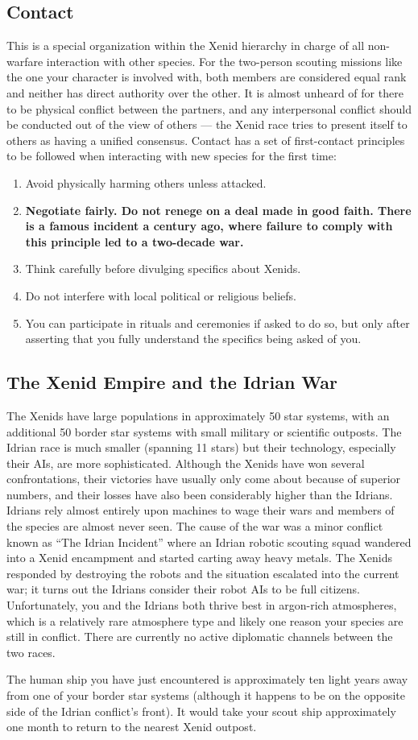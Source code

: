 \documentclass[blue]{guildcamp1}
\begin{document}
\subsection*{Contact}

This is a special organization within the Xenid hierarchy in charge of all non-warfare interaction with other species. For the two-person scouting missions like the one your character is involved with, both members are considered equal rank and neither has direct authority over the other. It is almost unheard of for there to be physical conflict between the partners, and any interpersonal conflict should be conducted out of the view of others --- the Xenid race tries to present itself to others as having a unified consensus. Contact has a set of first-contact principles to be followed when interacting with new species for the first time:

\begin{enumerate}
\item Avoid physically harming others unless attacked.
\item \textbf{Negotiate fairly. Do not renege on a deal made in good faith. There is a famous incident a century ago, where failure to comply with this principle led to a two-decade war.}
\item Think carefully before divulging specifics about Xenids.
\item Do not interfere with local political or religious beliefs.
\item You can participate in rituals and ceremonies if asked to do so, but only after asserting that you fully understand the specifics being asked of you.
\end{enumerate}
 
\subsection*{The Xenid Empire and the Idrian War}

The Xenids have large populations in approximately 50 star systems, with an additional 50 border star systems with small military or scientific outposts. The Idrian race is much smaller (spanning 11 stars) but their technology, especially their AIs, are more sophisticated. Although the Xenids have won several confrontations, their victories have usually only come about because of superior numbers, and their losses have also been considerably higher than the Idrians. Idrians rely almost entirely upon machines to wage their wars and members of the species are almost never seen. The cause of the war was a minor conflict known as ``The Idrian Incident'' where an Idrian robotic scouting squad wandered into a Xenid encampment and started carting away heavy metals. The Xenids responded by destroying the robots and the situation escalated into the current war; it turns out the Idrians consider their robot AIs to be full citizens. Unfortunately, you and the Idrians both thrive best in argon-rich atmospheres, which is a relatively rare atmosphere type and likely one reason your species are still in conflict. There are currently no active diplomatic channels between the two races.

The human ship you have just encountered is approximately ten light years away from one of your border star systems (although it happens to be on the opposite side of the Idrian conflict's front). It would take your scout ship approximately one month to return to the nearest Xenid outpost.
\end{document}
